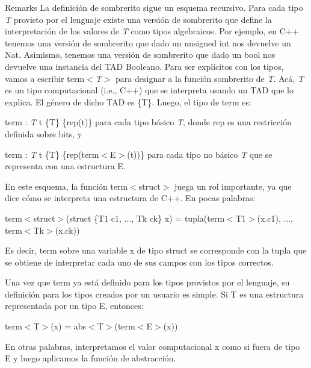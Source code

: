 \begin{DoxyRemark}{Remarks}
La definición de sombrerito sigue un esquema recursivo. Para cada tipo {\itshape T} provisto por el lenguaje existe una versión de sombrerito que define la interpretación de los valores de {\itshape T} como tipos algebraicos. Por ejemplo, en C++ tenemos una versión de sombrerito que dado un unsigned int nos devuelve un Nat. Asimismo, tenemos una versión de sombrerito que dado un bool nos devuelve una instancia del T\+AD Booleano. Para ser explícitos con los tipos, vamos a escribir term$<${\itshape T$>$} para designar a la función sombrerito de {\itshape T}. Acá, {\itshape T} es un tipo computacional (i.\+e., C++) que se interpreta usando un T\+AD que lo explica. El género de dicho T\+AD es \{T\}. Luego, el tipo de term es\+:
\begin{DoxyEnumerate}
\item term \+: {\itshape T} t  \{T\} \{rep(t)\} para cada tipo básico {\itshape T}, donde rep es una restricción definida sobre bits, y
\item term \+: {\itshape T} t  \{T\} \{rep(term$<$\+E$>$(t))\} para cada tipo no básico {\itshape T} que se representa con una estructura E.
\end{DoxyEnumerate}

En este esquema, la función term$<$struct$>$ juega un rol importante, ya que dice cómo se interpreta una estructura de C++. En pocas palabras\+:
\begin{DoxyItemize}
\item term$<$struct$>$(struct \{T1 c1, ..., Tk ck\} x) = tupla(term$<$\+T1$>$(x.\+c1), ..., term$<$\+Tk$>$(x.\+ck))
\end{DoxyItemize}

Es decir, term sobre una variable x de tipo struct se corresponde con la tupla que se obtiene de interpretar cada uno de sus campos con los tipos correctos.

Una vez que term ya está definido para los tipos provistos por el lenguaje, su definición para los tipos creados por un usuario es simple. Si T es una estructura representada por un tipo E, entonces\+:
\begin{DoxyItemize}
\item term$<$\+T$>$(x) = abs$<$\+T$>$(term$<$\+E$>$(x))
\end{DoxyItemize}

En otras palabras, interpretamos el valor computacional x como si fuera de tipo E y luego aplicamos la función de abstracción. 
\end{DoxyRemark}



